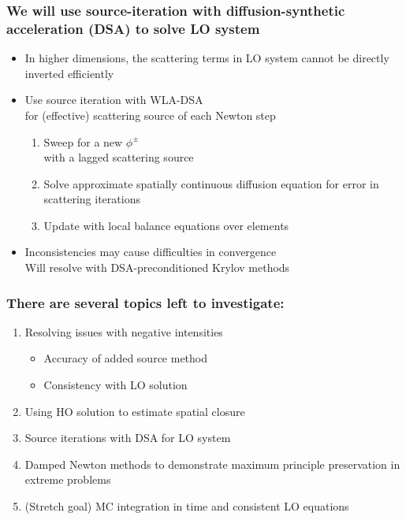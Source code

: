 \documentclass[xcolor=dvipsnames,hyperref={pdfpagelabels=false},unknownkeysallowed]{beamer}
\newcommand{\colb}[1]{{\color{blue} #1}}
\newcommand{\colG}[1]{{\color{Gray!110} #1}}
\newlength{\wideitemsep}
\let\olditem\item
\renewcommand{\item}{\setlength{\itemsep}{\wideitemsep}\olditem}
\begin{document}
\begin{frame}
    \frametitle{We will use source-iteration with diffusion-synthetic acceleration (DSA) to solve LO system}
    \begin{itemize}
        \item[] In higher dimensions, the scattering terms in LO system cannot be directly inverted efficiently
        \item[] Use source iteration with WLA-DSA \\ \colG{for (effective) scattering source
            of each Newton step}
            \begin{enumerate}
                \item Sweep for a new $\phi^{\pm}$ \\ \colG{with a lagged scattering
                    source}
                \item Solve approximate \colb{spatially continuous} diffusion equation for error in
                    scattering iterations
                \item Update with local balance equations over elements
            \end{enumerate}
        \item[] Inconsistencies may cause difficulties in convergence \\
            \colG{Will resolve with DSA-preconditioned Krylov methods}
    \end{itemize}

\end{frame}


\begin{frame}
    \frametitle{\colb{There are several topics left to investigate:}}
        \begin{enumerate}
            \item Resolving issues with negative intensities\colG{
                \begin{itemize}
                    \item Accuracy of added source method
                    \item Consistency with LO solution
                \end{itemize}}
            \item Using HO solution to estimate spatial closure
            \item Source iterations with DSA for LO system
            \item Damped Newton methods to demonstrate maximum principle preservation in
                extreme problems
            \item (Stretch goal) MC integration in time and consistent LO equations
        \end{enumerate}
    \end{frame}
\end{document}
